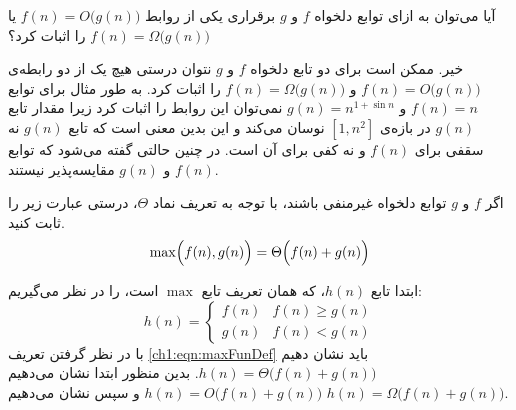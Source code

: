
 آیا می‌توان به ازای توابع دلخواه {$f$} و {$g$} برقراری یکی از روابط {$f(n)=O\big(g(n)\big)$} یا {$f(n)=\Omega \big(g(n)\big)$} را اثبات کرد؟


خیر. ممکن است برای دو تابع دلخواه {$f$} و {$g$} نتوان درستی هیچ یک از دو رابطه‌ی {$f(n)=O\big(g(n)\big)$} و {$f(n)=\Omega \big(g(n)\big)$} را اثبات کرد. به طور مثال برای توابع {$f(n)=n$} و {$g(n)=n^{1+\sin n}$} نمی‌توان این روابط را اثبات کرد زیرا مقدار تابع {$g(n)$} در بازه‌ی {$[1,n^2]$} نوسان می‌کند و این بدین معنی است که تابع {$g(n)$} نه سقفی برای {$f(n)$} و نه کفی برای آن است. در چنین حالتی گفته می‌شود که توابع {$f(n)$} و {$g(n)$} مقایسه‌پذیر نیستند.

 اگر {$f$}  و {$g$} توابع دلخواه غیرمنفی باشند، با توجه به تعریف نماد {$\Theta$}، درستی عبارت زیر را ثابت کنید.
\begin{displaymath}
\max \Bigl( f(n),g(n)\Bigr) =\Theta \Bigl( f(n)+g(n) \Bigr)
\end{displaymath}

ابتدا تابع {$h(n)$}، که همان تعریف تابع {$\max$} است، را در نظر می‌گیریم:
\begin{equation}
h(n) =
\begin{cases}
f(n) &  f(n) \geq g(n)\\
g(n) & f(n) < g(n)
\end{cases}\label{ch1:eqn:maxFunDef}
\end{equation}
با در نظر گرفتن تعریف {\eqref{ch1:eqn:maxFunDef}} باید نشان‌ دهیم {$h(n) =\Theta \bigl( f(n)+g(n) \bigr)$}. بدین منظور ابتدا نشان می‌دهیم {$h(n) =O \bigl( f(n)+g(n) \bigr)$} و سپس نشان می‌دهیم {$h(n) =\Omega \bigl( f(n)+g(n) \bigr)$}.

